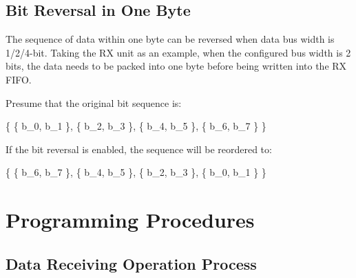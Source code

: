 \documentclass[main\_\_EN.tex]{subfiles}
\begin{document}
\subsection{Bit Reversal in One Byte}
The sequence of data within one byte can be reversed when data bus width is 1/2/4-bit. Taking the RX unit as an example, when the configured bus width is 2 bits, the data needs to be packed into one byte before being written into the RX FIFO.

Presume that the original bit sequence is:

\begin{center}
\{ \{ b\_{0}, b\_{1} \}, \{ b\_{2}, b\_{3} \}, \{ b\_{4}, b\_{5} \}, \{ b\_{6}, b\_{7} \} \}
\end{center}

If the bit reversal is enabled, the sequence will be reordered to:

\begin{center}
\{ \{ b\_{6}, b\_{7} \}, \{ b\_{4}, b\_{5} \}, \{ b\_{2}, b\_{3} \}, \{ b\_{0}, b\_{1} \} \}
\end{center}



\section{Programming Procedures}
\label{sec:parlio-prog-procedures}

\subsection{Data Receiving Operation Process}
\end{document}
